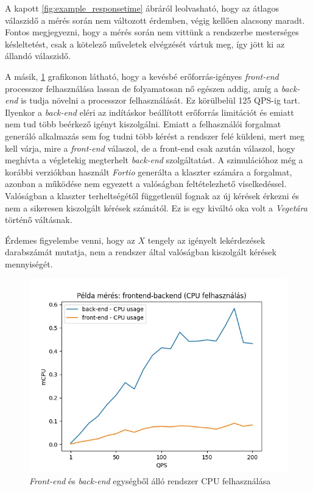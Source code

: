 A kapott \ref{fig:example_responsetime} ábráról leolvasható, hogy az átlagos válaszidő a mérés során nem változott érdemben, végig kellően alacsony maradt.
Fontos megjegyezni, hogy a mérés során nem vittünk a rendszerbe mesterséges késleltetést, csak a kötelező műveletek elvégzését vártuk meg, így jött ki az állandó válaszidő.

A másik, \ref{fig:example_plot} grafikonon látható, hogy a kevésbé erőforrás-igényes \textit{front-end} processzor felhasználása lassan de folyamatosan nő egészen addig, amíg a \textit{back-end} is tudja növelni a processzor felhasználását. Ez körülbelül 125 QPS-ig tart. Ilyenkor a \textit{back-end} eléri az indításkor beállított erőforrás limitációt és emiatt nem tud több beérkező igényt kiszolgálni.  Emiatt a felhasználói forgalmat generáló alkalmazás sem fog tudni több kérést a rendszer felé küldeni, mert meg kell várja, mire a \textit{front-end} válaszol, de a front-end csak azután válaszol, hogy meghívta a végletekig megterhelt \textit{back-end} szolgáltatást.
A szimulációhoz még a korábbi verziókban használt \textit{Fortio} generálta a klaszter számára a forgalmat, azonban a működése nem egyezett a valóságban feltételezhető viselkedéssel.
Valóságban a klaszter terheltségétől függetlenül fognak az új kérések érkezni és nem a sikeresen kiszolgált kérések számától.
Ez is egy kiváltó oka volt a \textit{Vegetára} történő váltásnak.

Érdemes figyelembe venni, hogy az $X$ tengely az igényelt lekérdezések darabszámát mutatja, nem a rendszer által valóságban kiszolgált kérések mennyiségét.
 \\


\begin{figure}[!ht]
\centering
\includegraphics[width=150mm, keepaspectratio]{figures/sample_plot_cpu.jpg}
\caption{\textit{Front-end} és \textit{back-end} egységből álló rendszer CPU felhasználása}
\label{fig:example_plot}
\end{figure}

